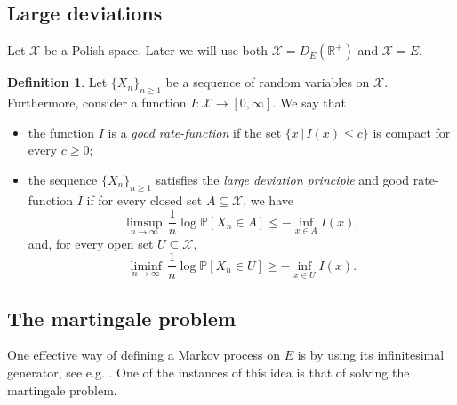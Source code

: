 \documentclass[a4paper]{article}
\newcommand{\cX}{\mathcal{X}}
\newcommand{\bR}{\mathbb{R}}
\newcommand{\PR}{\mathbb{P}}
\numberwithin{equation}{section}
\theoremstyle{definition}
\newtheorem{definition}[theorem]{Definition}
\begin{document}
\subsection{Large deviations} \label{section:preliminaries_LDP}

Let $\cX$ be a Polish space. Later we will use both $\cX = D_E(\bR^+)$ and $\cX = E$.

\begin{definition}
	Let $\{X_n\}_{n \geq 1}$ be a sequence of random variables on $\mathcal{X}$. Furthermore, consider a function $I : \mathcal{X} \rightarrow [0,\infty]$. We say that
	\begin{itemize}
		\item  
		the function $I$ is a \textit{good rate-function} if the set $\{x \, | \, I(x) \leq c\}$ is compact for every $c \geq 0$;
		\item 
		the sequence $\{X_n\}_{n\geq 1}$ satisfies the \textit{large deviation principle} and good rate-function $I$ if for every closed set $A \subseteq \mathcal{X}$, we have 
		\begin{equation*}
			\limsup_{n \rightarrow \infty} \, \frac{1}{n} \log \PR[X_n \in A] \leq - \inf_{x \in A} I(x),
		\end{equation*}
		and, for every open set $U \subseteq \mathcal{X}$, 
		\begin{equation*}
			\liminf_{n \rightarrow \infty} \, \frac{1}{n} \log \PR[X_n \in U] \geq - \inf_{x \in U} I(x).
		\end{equation*}
	\end{itemize}
\end{definition}


\subsection{The martingale problem} \label{section:martingale_problem}

One effective way of defining a Markov process on $E$ is by using its infinitesimal generator, see e.g. \cite{EK86}. One of the instances of this idea is that of solving the martingale problem. 
\end{document}
